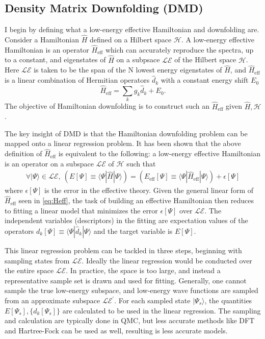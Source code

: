 \documentclass[12pt]{article}
\begin{document}
\subsection{Density Matrix Downfolding (DMD)}
I begin by defining what a low-energy effective Hamiltonian and downfolding are.
Consider a Hamiltonian $\hat{H}$ defined on a Hilbert space $\mathcal{H}$.
A low-energy effective Hamiltonian is an operator $\hat{H}_\text{eff}$ which can accurately reproduce the spectra, up to a constant, and eigenstates of $\hat{H}$ on a subpsace $\mathcal{LE}$ of the Hilbert space $\mathcal{H}$.
Here $\mathcal{LE}$ is taken to be the span of the N lowest energy eigenstates of $\hat{H}$, and $\hat{H}_\text{eff}$ is a linear combination of Hermitian operators $\hat{d}_k$ with a constant energy shift $E_0$
\begin{equation}
\hat{H}_\text{eff} = \sum_{k} g_k \hat{d}_k  + E_0.
\label{eq:Heff}
\end{equation}
The objective of Hamiltonian downfolding is to construct such an $\hat{H}_\text{eff}$ given $\hat{H}, \mathcal{H}$.

The key insight of DMD is that the Hamiltonian downfolding problem can be mapped onto a linear regression problem.
It has been shown that the above definition of $\hat{H}_\text{eff}$ is equivalent to the following: a low-energy effective Hamiltonian is an operator on a subspace $\mathcal{LE}$ of $\mathcal{H}$ such that 
\begin{equation}
\begin{split}
\forall |\Psi\rangle \in \mathcal{LE},\ (E[\Psi] \equiv \langle \Psi|\hat{H} | \Psi \rangle)  = (E_\text{eff}[\Psi] \equiv \langle \Psi | \hat{H}_\text{eff} | \Psi \rangle) + \epsilon[\Psi]
\end{split}
\label{eq:DMD}
\end{equation}
where $\epsilon[\Psi]$ is the error in the effective theory.
Given the general linear form of $\hat{H}_\text{eff}$ seen in \eqref{eq:Heff}, 
the task of building an effective Hamiltonian then reduces to fitting a linear model that minimizes the error $\epsilon[\Psi]$ over $\mathcal{LE}$.
The independent variables (descriptors) in the fitting are expectation values of the operators $d_k[\Psi] \equiv \langle \Psi |\hat{d}_k|\Psi \rangle$ and the target variable is $E[\Psi]$.

This linear regression problem can be tackled in three steps, beginning with sampling states from $\mathcal{LE}$.
Ideally the linear regression would be conducted over the entire space $\mathcal{LE}$. 
In practice, the space is too large, and instead a representative sample set is drawn and used for fitting.
Generally, one cannot sample the true low-energy subspace, and low-energy wave functions are sampled from an approximate subspace $\mathcal{LE}^\prime$.
For each sampled state $|\Psi_s\rangle$, the quantities $E[\Psi_s], \{d_k[\Psi_s]\}$ are calculated to be used in the linear regression.
The sampling and calculation are typically done in QMC, but less accurate methods like DFT and Hartree-Fock can be used as well, resulting is less accurate models.
\end{document}
